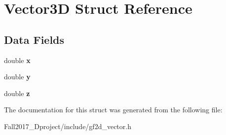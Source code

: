 \hypertarget{struct_vector3_d}{}\section{Vector3D Struct Reference}
\label{struct_vector3_d}
\subsection*{Data Fields}
\begin{DoxyCompactItemize}
\item 
\mbox{\label{struct_vector3_d_af88b946fb90d5f08b5fb740c70e98c10}} 
double {\bfseries x}
\item 
\mbox{\label{struct_vector3_d_ab927965981178aa1fba979a37168db2a}} 
double {\bfseries y}
\item 
\mbox{\label{struct_vector3_d_ab3e6ed577a7c669c19de1f9c1b46c872}} 
double {\bfseries z}
\end{DoxyCompactItemize}


The documentation for this struct was generated from the following file\+:\begin{DoxyCompactItemize}
\item 
Fall2017\+\_\+Dproject/include/gf2d\+\_\+vector.\+h\end{DoxyCompactItemize}
